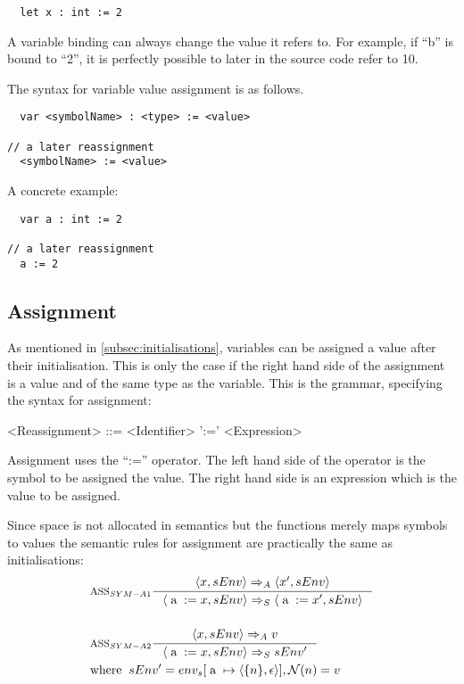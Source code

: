 \begin{verbatim}
  let x : int := 2
\end{verbatim}

A variable binding can always change the value it refers to. For example, if \enquote{b} is bound to \enquote{2}, it is perfectly possible to later in the source code refer to {10}.

The syntax for variable value assignment is as follows.

\begin{verbatim}
  var <symbolName> : <type> := <value>

// a later reassignment
  <symbolName> := <value>
\end{verbatim}
A concrete example:

\begin{verbatim}
  var a : int := 2
  
// a later reassignment
  a := 2
\end{verbatim}

\subsection{Assignment}\label{subsec:assignment}
As mentioned in \cref{subsec:initialisations}, variables can be assigned a value after their initialisation. This is only the case if the right hand side of the assignment is a value and of the same type as the variable.
This is the grammar, specifying the syntax for assignment:
\begin{grammar}
<Reassignment> ::= <Identifier>  ':=' <Expression>
\end{grammar}
Assignment uses the \enquote{:=} operator. The left hand side of the operator is the symbol to be assigned the value. The right hand side is an expression which is the value to be assigned.

Since space is not allocated in semantics but the functions merely maps symbols to values the semantic rules for assignment are practically the same as initialisations:
\begin{align*}
&\inference[$\text{ASS}_{SYM-A1}$]{\Braket{x,sEnv} \Rightarrow_A \Braket{x',sEnv}}
                         {\Braket{\Ta := x,sEnv} \Rightarrow_S \Braket{\Ta := x',sEnv}}
\\\\
&\inference[$\text{ASS}_{SYM-A2}$]{\Braket{x,sEnv} \Rightarrow_A v}
                         {\Braket{\Ta := x,sEnv} \Rightarrow_S sEnv'}
\\
&{\Twhere sEnv' = env_{s}[\Ta \mapsto \Braket{\{n\},\epsilon}], \mathcal{N}(n) = v}
\end{align*}

